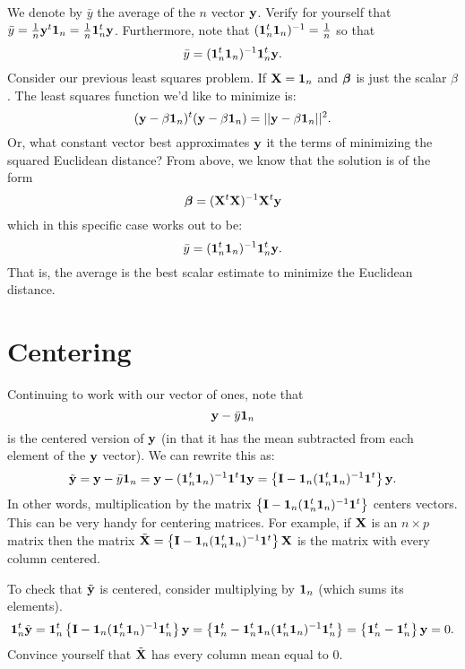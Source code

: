 We denote by $\bar y$ the average of the $n$ vector $\mathbf{y}$.
Verify for yourself that $\bar y = \frac{1}{n} \mathbf{y}^t \mathbf{1}_n = \frac{1}{n} \mathbf{1}_n^t \mathbf{y}$.
Furthermore, note that $(\mathbf{1}_n^t \mathbf{1}_n)^{-1} = \frac{1}{n}$ so that
$$
\bar y = (\mathbf{1}_n^t \mathbf{1}_n)^{-1} \mathbf{1}^t_n \mathbf{y}.
$$
Consider our previous least squares problem. If $\mathbf{X} = \mathbf{1}_n$ and $\boldsymbol{\beta}$ 
is just the scalar $\beta$. The least squares function we'd like to minimize
is:
$$
(\mathbf{y} - \beta \mathbf{1}_n)^t (\mathbf{y} - \beta \mathbf{1}_n) = ||\mathbf{y} - \beta \mathbf{1}_n||^2.
$$
Or, what constant vector best approximates $\mathbf{y}$ it the terms of minimizing the
squared Euclidean distance? From above, we know that the solution is of the form 
$$
\boldsymbol{\beta} = (\mathbf{X}^t \mathbf{X})^{-1} \mathbf{X}^t \mathbf{y}
$$
which in this specific case works out to be:
$$
\bar y = (\mathbf{1}_n^t \mathbf{1}_n)^{-1} \mathbf{1}^t_n \mathbf{y}.
$$
That is, the average is the best scalar estimate to minimize the 
Euclidean distance. 

\section{Centering}

Continuing to work with our vector of ones, note that 
$$
\mathbf{y} - \bar y \mathbf{1}_n
$$
is the centered version of $\mathbf{y}$ (in that it has the mean subtracted from each element of the $\mathbf{y}$ vector).
We can rewrite this as:
$$
\tilde {\mathbf{y}} = \mathbf{y} - \bar y \mathbf{1}_n = \mathbf{y} - (\mathbf{1}_n^t \mathbf{1}_n)^{-1} \mathbf{1}^t \mathbf{1} \mathbf{y}
= \left\{ \mathbf{I} - \mathbf{1}_n (\mathbf{1}_n^t \mathbf{1}_n)^{-1} \mathbf{1}^t \right\} \mathbf{y}.
$$
In other words, multiplication by the matrix $ \left\{ \mathbf{I} - \mathbf{1}_n (\mathbf{1}_n^t \mathbf{1}_n)^{-1} \mathbf{1}^t \right\}$
centers vectors. This can be very handy for centering matrices. For example, if $\mathbf{X}$ is an $n\times p$
matrix then the matrix $\tilde {\mathbf{X}}  = \left\{ \mathbf{I} - \mathbf{1}_n (\mathbf{1}_n^t \mathbf{1}_n)^{-1} \mathbf{1}^t \right\} \mathbf{X}$
is the matrix with every column centered. 

To check that $\tilde {\mathbf{y}}$ is centered, consider multiplying by $\mathbf{1}_n$ (which sums its elements). 
$$
\mathbf{1}_n^t \tilde {\mathbf{y}} = \mathbf{1}_n^t \left\{ \mathbf{I} - \mathbf{1}_n (\mathbf{1}_n^t \mathbf{1}_n)^{-1} \mathbf{1}_n^t \right\} \mathbf{y}
= \left\{ \mathbf{1}_n^t - \mathbf{1}_n^t \mathbf{1}_n (\mathbf{1}_n^t \mathbf{1}_n)^{-1} \mathbf{1}_n^t \right\} =
\left\{ \mathbf{1}_n^t - \mathbf{1}_n^t \right\}\mathbf{y} = 0.
$$
Convince yourself that $\tilde {\mathbf{X}}$ has every column mean equal to 0.

